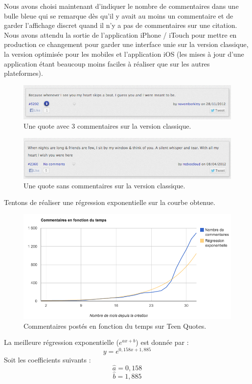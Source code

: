 \documentclass{report}
\begin{document}
	Nous avons choisi maintenant d'indiquer le nombre de commentaires dans une bulle bleue qui se remarque dès qu'il y avait au moins un commentaire et de garder l'affichage discret quand il n'y a pas de commentaires sur une citation. Nous avons attendu la sortie de l'application iPhone / iTouch pour mettre en production ce changement pour garder une interface unie sur la version classique, la version optimisée pour les mobiles et l'application iOS (les mises à jour d'une application étant beaucoup moins faciles à réaliser que sur les autres plateformes).
	\begin{figure}[H]
		\center
		\includegraphics[width=470px]{images/quoteCommentaires.png}
		\caption{Une quote avec 3 commentaires sur la version classique.}
	\end{figure}
	\begin{figure}[H]
		\center
		\includegraphics[width=470px]{images/quoteSansCommentaires.png}
		\caption{Une quote sans commentaires sur la version classique.}
	\end{figure}
	Tentons de réaliser une régression exponentielle sur la courbe obtenue.
	\begin{figure}[H]
		\center
		\includegraphics[width=450px]{images/commentairesRegression.png}
		\caption{Commentaires postés en fonction du temps sur Teen Quotes.}
	\end{figure}
	La meilleure régression exponentielle ($e^{ax + b}$) est donnée par :
	\[y = e^{0,158x + 1,885}\]
	Soit les coefficients suivants :
	\[\widehat{a} = 0,158\]
	\[\widehat{b} = 1,885\]

\end{document}
